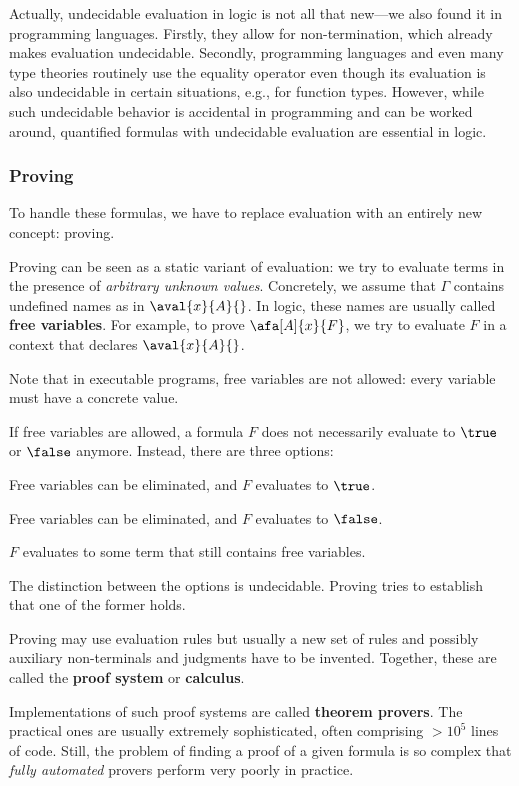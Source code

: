 Actually, undecidable evaluation in logic is not all that new---we also found it in programming languages.
Firstly, they allow for non-termination, which already makes evaluation undecidable.
Secondly, programming languages and even many type theories routinely use the equality operator even though its evaluation is also undecidable in certain situations, e.g., for function types.
However, while such undecidable behavior is accidental in programming and can be worked around, quantified formulas with undecidable evaluation are essential in logic.

\subsubsection{Proving}

To handle these formulas, we have to replace evaluation with an entirely new concept: proving.

Proving can be seen as a static variant of evaluation: we try to evaluate terms in the presence of \emph{arbitrary unknown values}.
Concretely, we assume that $\Gamma$ contains undefined names as in $\aval{x}{A}{}$.
In logic, these names are usually called \textbf{free variables}.
For example, to prove $\afa[A]{x}{F}$, we try to evaluate $F$ in a context that declares $\aval{x}{A}{}$.

Note that in executable programs, free variables are not allowed: every variable must have a concrete value.

If free variables are allowed, a formula $F$ does not necessarily evaluate to $\true$ or $\false$ anymore.
Instead, there are three options:
\begin{compactitem}
 \item Free variables can be eliminated, and $F$ evaluates to $\true$.
 \item Free variables can be eliminated, and $F$ evaluates to $\false$.
 \item $F$ evaluates to some term that still contains free variables.
\end{compactitem}

The distinction between the options is undecidable.
Proving tries to establish that one of the former holds.

Proving may use evaluation rules but usually a new set of rules and possibly auxiliary non-terminals and judgments have to be invented.
Together, these are called the \textbf{proof system} or \textbf{calculus}.

Implementations of such proof systems are called \textbf{theorem provers}.
The practical ones are usually extremely sophisticated, often comprising $>10^5$ lines of code.
Still, the problem of finding a proof of a given formula is so complex that \emph{fully automated} provers perform very poorly in practice.

